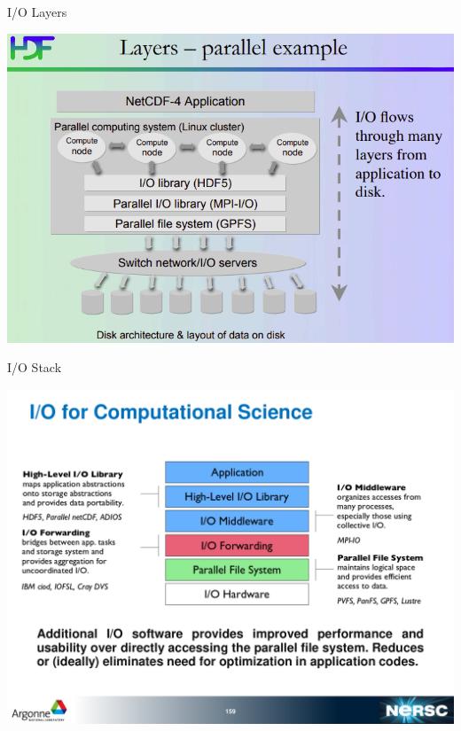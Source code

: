 \documentclass[compress,11pt,xcolor=svgnames,aspectratio=169]{beamer}
\begin{document}
\begin{frame}[t]{I/O Layers}

\begin{center}
\includegraphics[scale=0.5]{fig/io-layers}
\end{center}

\end{frame}

\begin{frame}[t]{I/O Stack}

\begin{center}
\includegraphics[scale=0.5]{fig/io-stack2}
\end{center}

\end{frame}
\end{document}
